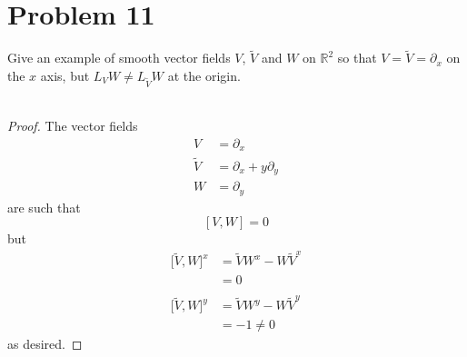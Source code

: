 \documentclass[fontsize=11pt]{scrartcl} %
\numberwithin{equation}{section} %
\numberwithin{figure}{section} %
\numberwithin{table}{section} %
\newcommand{\R}{\mathbb{R}}
\begin{document}
\section*{Problem 11}
Give an example of smooth vector fields $V$, $\tilde{V}$ and $W$ on $\R^2$ so
that $V=\tilde{V}=\partial_x$ on the $x$ axis, but $L_VW\neq L_{\tilde{V}}W$ at
the origin.
\\
\\
\begin{proof}
    The vector fields
    \[ 
        \begin{aligned}
            V &=\partial_x\\
            \tilde{V} &=\partial_x + y\partial_y\\
            W &=\partial_y
        \end{aligned}
    \]
    are such that
    \[
        [V,W] = 0
    \]
    but
    \[
        \begin{aligned}
            {[}\tilde{V},W{]}^x &= \tilde{V}W^x - W\tilde{V}^x\\
                            &= 0\\
            \\
            {[}\tilde{V},W{]}^y &= \tilde{V}W^y - W\tilde{V}^y\\
                            &= -1\neq 0
        \end{aligned}
    \]
    as desired.
\end{proof}
\end{document}
